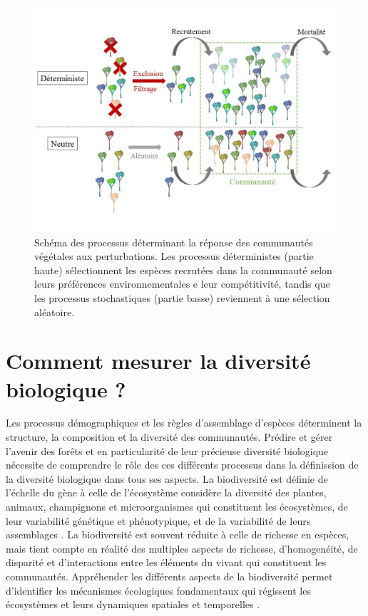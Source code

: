 \documentclass[
  11pt,
  french,
  A4paper,
  extrafontsizes,onecolumn,openright
  ]{memoir}
\begin{document}
\begin{figure}

{\centering \includegraphics[width=1\linewidth]{ExternalFig/Fig_AssemblyRules} 

}

\caption{Schéma des processus déterminant la réponse des communautés végétales aux perturbations. Les processus déterministes (partie haute) sélectionnent les espèces recrutées dans la communauté selon leurs préférences environnementales e leur compétitivité, tandis que les processus stochastiques (partie basse) reviennent à une sélection aléatoire.}\label{fig:AssemblyRules}
\end{figure}

\section{Comment mesurer la diversité biologique
?}\label{comment-mesurer-la-diversite-biologique}

Les processus démographiques et les règles d'assemblage d'espèces
déterminent la structure, la composition et la diversité des
communautés. Prédire et gérer l'avenir des forêts et en particularité de
leur précieuse diversité biologique nécessite de comprendre le rôle des
ces différents processus dans la définission de la diversité biologique
dans tous ses aspects. La biodiversité est définie de l'échelle du gène
à celle de l'écosystème considère la diversité des plantes, animaux,
champignons et microorganismes qui constituent les écosystèmes, de leur
variabilité génétique et phénotypique, et de la variabilité de leurs
assemblages \autocite{Loreau2005}. La biodiversité est souvent réduite à
celle de richesse en espèces, mais tient compte en réalité des multiples
aspects de richesse, d'homogenéité, de disparité et d'interactions entre
les éléments du vivant qui constituent les communautés. Appréhender les
différents aspects de la biodiversité permet d'identifier les mécanismes
écologiques fondamentaux qui régissent les écosystèmes et leurs
dynamiques spatiales et temporelles \autocites{Purvis2000}{Loreau2005}.
\end{document}
